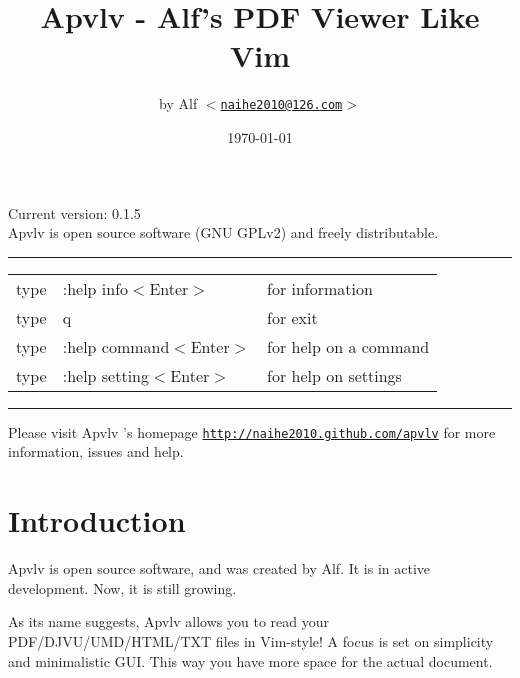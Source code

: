 \documentclass[a4paper,12pt]{article}
\newcommand{\apvlv}{\textsf{Apvlv{ }}}
\begin{document}
\large

\title{Apvlv - Alf's PDF Viewer Like Vim}
\author{by Alf \texttt{$<$\href{mailto:naihe2010@126.com}{naihe2010@126.com}$>$}}
\date{\today}
\maketitle{}

\begin{center}
Current version: 0.1.5\\
\vspace{1cm}
\apvlv is open source software (GNU GPLv2) and freely distributable.
\vspace{1cm}

\rule{\textwidth}{1pt}
\begin{tabular}{lll}
type & :help info$<$Enter$>$      & for information \\
type & q                          & for exit \\
type & :help command$<$Enter$>$   & for help on a command \\
type & :help setting$<$Enter$>$   & for help on settings \\ %
\end{tabular}
\rule{\textwidth}{1pt}

\vspace{3cm}
{\small Please visit \apvlv's homepage \texttt{\href{http://naihe2010.github.com/apvlv}{http://naihe2010.github.com/apvlv}} for more information, issues and help.}
\end{center}

\newpage

\section{Introduction}\label{intro}

\apvlv is open source software, and was created by Alf. It is in active development. Now, it is still growing.

As its name suggests, \apvlv allows you to read your PDF/\-DJVU/\-UMD/\-HTML/\-TXT files in Vim-style! A focus is set on simplicity and minimalistic GUI. This way you have more space for the actual document.
\end{document}
